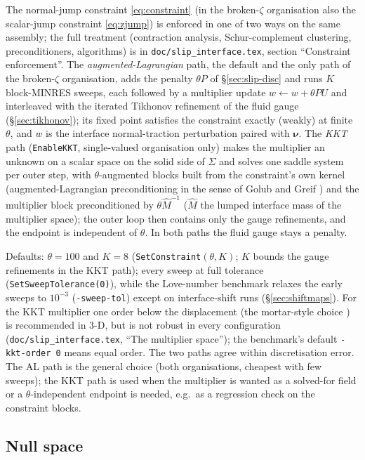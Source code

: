 \documentclass[11pt]{article}
\numberwithin{equation}{section}
\theoremstyle{remark}
\newcommand{\bnu}{\bm{\nu}}
\newcommand{\code}[1]{\texttt{#1}}
\begin{document}
The normal-jump constraint \eqref{eq:constraint} (in the broken-$\zeta$
organisation also the scalar-jump constraint \eqref{eq:zjump}) is
enforced in one of two ways on the same assembly; the full treatment
(contraction analysis, Schur-complement clustering, preconditioners,
algorithms) is in \code{doc/slip\_interface.tex}, section ``Constraint
enforcement''. The \emph{augmented-Lagrangian} path, the default and the
only path of the broken-$\zeta$ organisation, adds the penalty
$\theta P$ of \S\ref{sec:slip-disc} and runs $K$ block-MINRES sweeps,
each followed by a multiplier update $w\leftarrow w + \theta PU$ and
interleaved with the iterated Tikhonov refinement of the fluid gauge
(\S\ref{sec:tikhonov}); its fixed point satisfies the constraint exactly
(weakly) at finite $\theta$, and $w$ is the interface normal-traction
perturbation paired with $\bnu$. The \emph{KKT} path (\code{EnableKKT},
single-valued organisation only) makes the multiplier an unknown on a
scalar space on the solid side of $\Sigma$ and solves one saddle system
per outer step, with $\theta$-augmented blocks built from the
constraint's own kernel (augmented-Lagrangian preconditioning in the
sense of Golub and Greif \cite{GolubGreif2003}) and the multiplier block preconditioned by
$\theta\hat M^{-1}$ ($\hat M$ the lumped interface mass of the multiplier
space); the outer loop then contains only the gauge refinements, and the
endpoint is independent of $\theta$. In both paths the fluid gauge stays
a penalty.

Defaults: $\theta = 100$ and $K = 8$ (\code{SetConstraint}$(\theta, K)$;
$K$ bounds the gauge refinements in the KKT path); every sweep at full
tolerance (\code{SetSweepTolerance(0)}), while the Love-number benchmark
relaxes the early sweeps to $10^{-3}$ (\code{-sweep-tol}) except on
interface-shift runs (\S\ref{sec:shiftmaps}). For the KKT multiplier one
order below the displacement (the mortar-style choice
\cite{Wohlmuth2001}) is recommended in 3-D, but is not robust in every
configuration (\code{doc/slip\_interface.tex}, ``The multiplier space''); the
benchmark's default \code{-kkt-order 0} means equal order. The two paths agree within
discretisation error. The AL path is the general choice (both
organisations, cheapest with few sweeps); the KKT path is used when the
multiplier is wanted as a solved-for field or a $\theta$-independent
endpoint is needed, e.g.\ as a regression check on the constraint blocks.

\subsection{Null space}
\label{sec:slip-null}
\end{document}
